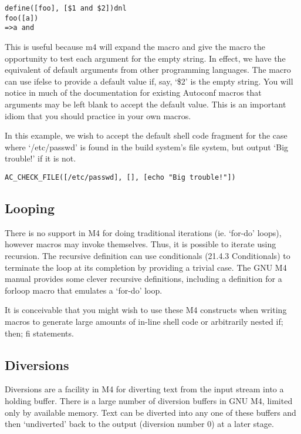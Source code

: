  	

\begin{verbatim}
define([foo], [$1 and $2])dnl
foo([a])
=>a and
\end{verbatim}

This is useful because m4 will expand the macro and give the macro the 
opportunity to test each argument for the empty string. In effect, we have the 
equivalent of default arguments from other programming languages. The macro 
can use ifelse to provide a default value if, say, `\$2' is the empty string.
You will notice in much of the documentation for existing Autoconf macros 
that arguments may be left blank to accept the default value. This is an 
important idiom that you should practice in your own macros.

In this example, we wish to accept the default shell code fragment for the case where `/etc/passwd' is found in the build system's file system, but output `Big trouble!' if it is not.

 	

\begin{verbatim}
AC_CHECK_FILE([/etc/passwd], [], [echo "Big trouble!"])
\end{verbatim}

\subsection{Looping}

There is no support in M4 for doing traditional iterations (ie. `for-do' loops), however macros may invoke themselves. Thus, it is possible to iterate using recursion. The recursive definition can use conditionals (21.4.3 Conditionals) to terminate the loop at its completion by providing a trivial case. The GNU M4 manual provides some clever recursive definitions, including a definition for a forloop macro that emulates a `for-do' loop.

It is conceivable that you might wish to use these M4 constructs when writing macros to generate large amounts of in-line shell code or arbitrarily nested if; then; fi statements. 

\subsection{Diversions}

Diversions are a facility in M4 for diverting text from the input stream into a holding buffer. There is a large number of diversion buffers in GNU M4, limited only by available memory. Text can be diverted into any one of these buffers and then `undiverted' back to the output (diversion number 0) at a later stage.

